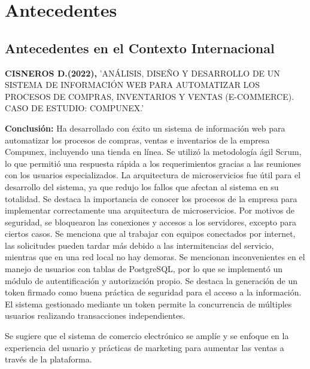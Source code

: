 \documentclass[12pt,a4paper]{article}
\newcommand{\espacio}{\par\vspace{3mm}}
\newcommand{\newsection}[1]{\section{\hspace{6mm} #1}}%
\newcommand{\newsubsection}[1]{\subsection{\hspace{5mm} #1}}
\begin{document}

\newpage
\newsection{Antecedentes }
\newsubsection{Antecedentes en el Contexto Internacional}
\textbf{CISNEROS D.(2022),}
'ANÁLISIS, DISEÑO Y DESARROLLO DE UN SISTEMA DE
INFORMACIÓN WEB PARA AUTOMATIZAR LOS PROCESOS DE
COMPRAS, INVENTARIOS Y VENTAS (E-COMMERCE).
CASO DE ESTUDIO: COMPUNEX.'
\espacio
\textbf{Conclusión: } 
Ha desarrollado con éxito un sistema de información web para automatizar los procesos de compras, ventas e inventarios de la empresa Compunex, incluyendo una tienda en línea. Se utilizó la metodología ágil Scrum, lo que permitió una respuesta rápida a los requerimientos gracias a las reuniones con los usuarios especializados. La arquitectura de microservicios fue útil para el desarrollo del sistema, ya que redujo los fallos que afectan al sistema en su totalidad. Se destaca la importancia de conocer los procesos de la empresa para implementar correctamente una arquitectura de microservicios. 
Por motivos de seguridad, se bloquearon las conexiones y accesos a los servidores, excepto para ciertos casos. Se menciona que al trabajar con equipos conectados por internet, las solicitudes pueden tardar más debido a las intermitencias del servicio, mientras que en una red local no hay demoras. Se mencionan inconvenientes en el manejo de usuarios con tablas de PostgreSQL, por lo que se implementó un módulo de autentificación y autorización propio. Se destaca la generación de un token firmado como buena práctica de seguridad para el acceso a la información. El sistema gestionado mediante un token permite la concurrencia de múltiples 
usuarios realizando transacciones independientes.
\espacio Se sugiere que el sistema de comercio electrónico se amplíe y se enfoque en la experiencia del usuario y prácticas de marketing para aumentar las ventas a través de la plataforma.
\cite{internacional}
\end{document}
